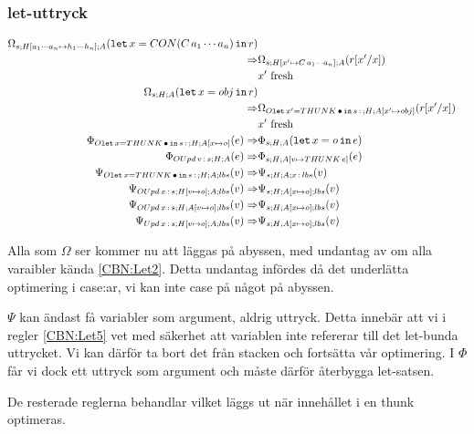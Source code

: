 \documentclass[../Optimise]{subfiles}
\begin{document}
\subsubsection{let-uttryck}
\begin{align}
\label{CBN:Let1} \Omega_{s;H[a_{1}\cdots a_{n}\mapsto h_{1}\cdots h_{n}];A}(\mathtt{let}\,x=CON(C\, a_{1}\cdots a_{n})\,\mathtt{in}\,r) \\ \nonumber \Rightarrow & \Omega_{s;H[x'\mapsto C\, a_{1}\cdots a_{n}];A}(r[x'/x])\\
   & x'\mbox{ fresh} \nonumber \\
\label{CBN:Let2} \Omega_{s;H;A}(\mathtt{let}\,x=obj\,\mathtt{in}\,r) \\ \nonumber \Rightarrow & \Omega_{O\mathtt{let\,}x'=THUNK\,\bullet\,\mathtt{in}\,s\,:\,;H;A[x'\mapsto obj]}(r[x'/x])\\
   & x'\mbox{ fresh} \nonumber \\
\label{CBN:Let3} \Phi_{O\mathtt{let\,}x=THUNK\,\bullet\,\mathtt{in}\,s\,:\,;H;A[x\mapsto o]}(e) \Rightarrow & \Phi_{s;H;A}(\mathtt{let}\,x=o\,\mathtt{in}\,e)\\
\label{CBN:Let4} \Phi_{OUpd\,v\,:\,s;H;A}(e) \Rightarrow & \Phi_{s;H;A[v\mapsto THUNK\,e]}(e) \\
\label{CBN:Let5} \Psi_{O\mathtt{let\,}x=THUNK\,\bullet\,\mathtt{in}\,s\,:\,;H;A;lbs}(v) \Rightarrow & \Psi_{s;H;A;x\,:\, lbs}(v) \\
\label{CBN:Let6} \Psi_{OUpd\,x\,:\,s;H[v\mapsto o];A;lbs}(v) \Rightarrow & \Psi_{s;H;A[x\mapsto o];lbs}(v)\\
\Psi_{OUpd\,x\,:\,s;H;A[v\mapsto o];lbs}(v) \Rightarrow & \Psi_{s;H;A[x\mapsto o];lbs}(v)\\
\label{CBN:Let7} \Psi_{Upd\,x\,:\,s;H[v\mapsto o];A;lbs}(v)  \Rightarrow & \Psi_{s;H;A[x\mapsto o];lbs}(v) 
\end{align}

Alla  som $\Omega$ ser kommer nu att läggas på abyssen, med undantag av  om alla varaibler kända \eqref{CBN:Let2}. Detta undantag infördes då det underlätta optimering i case:ar, vi kan inte case på något på abyssen.

$\Psi$ kan ändast få variabler som argument, aldrig uttryck. Detta innebär att vi i regler \eqref{CBN:Let5} vet med säkerhet att variablen inte refererar till det let-bunda uttrycket. Vi kan därför ta bort det från stacken och fortsätta vår optimering. I $\Phi$ får vi dock ett uttryck som argument och måste därför återbygga let-satsen. 

De resterade reglerna behandlar  vilket läggs ut när innehållet i en thunk optimeras. 

\end{document}
